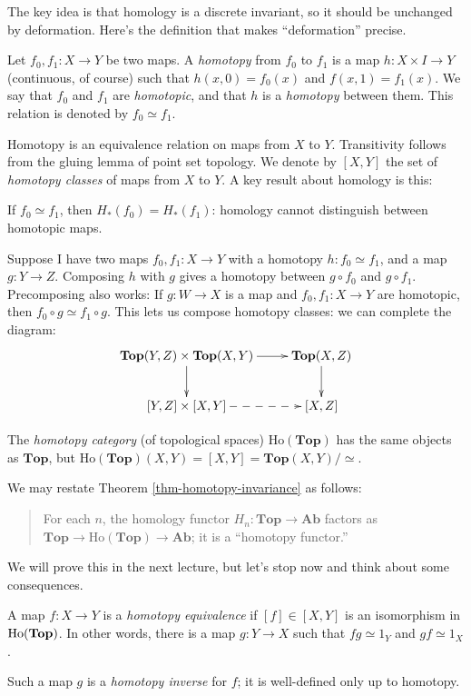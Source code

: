 The key idea is that homology is a discrete invariant, so it should be 
unchanged by deformation. Here's the definition that makes ``deformation''
precise.
\begin{definition}
Let $f_0,f_1:X\to Y$ be two maps. A {\em homotopy} from $f_0$ to $f_1$ is a map $h:X\times I\to Y$ (continuous, of course) such that $h(x,0)=f_0(x)$ and $f(x,1)=f_1(x)$. We say that $f_0$ and $f_1$ are {\em homotopic}, and that $h$ is a {\em homotopy} between them. This relation is denoted by $f_0\simeq f_1$. 
\end{definition}
Homotopy is an equivalence relation on maps from $X$ to $Y$.
Transitivity follows from the gluing lemma of point set topology.
We denote by $[X,Y]$ the set of {\em homotopy classes} of maps from $X$ to $Y$.
A key result about homology is this:
\begin{theorem}\label{thm-homotopy-invariance}
If $f_0\simeq f_1$, then $ H_\ast(f_0)= H_\ast(f_1)$: homology cannot distinguish between homotopic maps.
\end{theorem}
Suppose I have two maps $f_0,f_1:X\to Y$ with a homotopy $h:f_0\simeq f_1$, and a map $g:Y\to Z$. Composing $h$ with $g$ gives a homotopy between $g\circ f_0$ and $g\circ f_1$. Precomposing also works: If $g:W\to X$ is a map and $f_0,f_1:X\to Y$ are homotopic, then $f_0\circ g\simeq f_1\circ g$. This lets us compose homotopy classes: we can complete the diagram:
\begin{equation*}
\xymatrix{\mathbf{Top}(Y,Z)\times\mathbf{Top}(X,Y)\ar[d]\ar[r] & \mathbf{Top}(X,Z)\ar[d]\\
[Y,Z]\times[X,Y]\ar@{-->}[r] & [X,Z]}
\end{equation*}
\begin{definition}
The {\em homotopy category} (of topological spaces) 
$\mathrm{Ho}(\mathbf{Top})$ has the same objects as $\mathbf{Top}$, but
$\mathrm{Ho}(\mathbf{Top})(X,Y)=[X,Y]=\mathbf{Top}(X,Y)/\simeq$.
\end{definition}
We may restate Theorem \ref{thm-homotopy-invariance} as follows:
\begin{quote}
For each $n$,
the homology functor $ H_n:\mathbf{Top}\to\mathbf{Ab}$ factors as $\mathbf{Top}\to\mathrm{Ho}(\mathbf{Top})\to\mathbf{Ab}$; it is a ``homotopy functor.''
\end{quote}
We will prove this in the next lecture, but let's stop now and think about some
consequences. 
\begin{definition}
A map $f:X\to Y$ is a {\em homotopy equivalence} if $[f]\in[X,Y]$ is an isomorphism in $\mathrm{Ho}(\mathbf{Top})$. In other words, there is a map $g:Y\to X$ such that $fg\simeq 1_Y$ and $gf\simeq1_X$. 
\end{definition}
Such a map $g$ is a {\em homotopy inverse} for $f$; it is well-defined
only up to homotopy.

